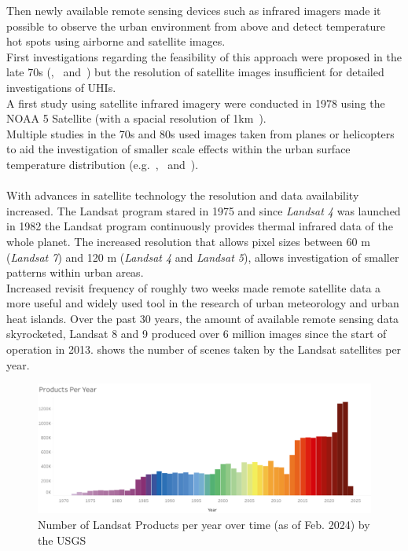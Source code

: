 \documentclass[12pt,a4paper, english,twoside]{article}
\begin{document}
  Then newly available remote sensing devices such as infrared imagers made it possible to observe the urban environment from above and detect temperature hot spots using airborne and satellite images.  \\
  First investigations regarding the feasibility of this approach were proposed in the late 70s (\cite{Watson1975},~\cite{Carlson1977} and~\cite{Block1978}) but the resolution of satellite images insufficient for detailed investigations of \glspl{UHI}.\\
  A first study using satellite infrared imagery were conducted in 1978 using the NOAA 5 Satellite (with a spacial resolution of 1km~\autocite{Matson1978}).\\
  Multiple studies in the 70s and 80s used images taken from planes or helicopters to aid the investigation of smaller scale effects within the urban surface temperature distribution (e.g.~\cite{Landsberg1979},~\cite{ljungberg1980use} and~\cite{Foster1981}). \\ \\
  With advances in satellite technology the resolution and data availability increased. 
  The Landsat program stared in 1975 and since \textit{Landsat 4} was launched in 1982 the Landsat program continuously provides thermal infrared data of the whole planet. 
  The increased resolution that allows pixel sizes between 60 m (\textit{Landsat 7}) and 120 m (\textit{Landsat 4} and \textit{Landsat 5}), allows investigation of smaller patterns within urban areas.\\
  Increased revisit frequency of roughly two weeks made remote satellite data a more useful and widely used tool in the research of urban meteorology and urban heat islands. 
  Over the past 30 years, the amount of available remote sensing data skyrocketed, Landsat 8 and 9 produced over 6 million images since the start of operation in 2013.  shows the number of scenes taken by the Landsat satellites per year.
  \begin{figure}[!htbp]
    \centering
    \includegraphics[width=\textwidth]{img/LandsatDataArchiveStatsProductsPerYear.png}
  \caption{Number of Landsat Products per year over time (as of Feb. 2024) by the USGS~\autocite{landsatstats}\label{fig:landsatproductsovertime}}
  \end{figure}
\end{document}
